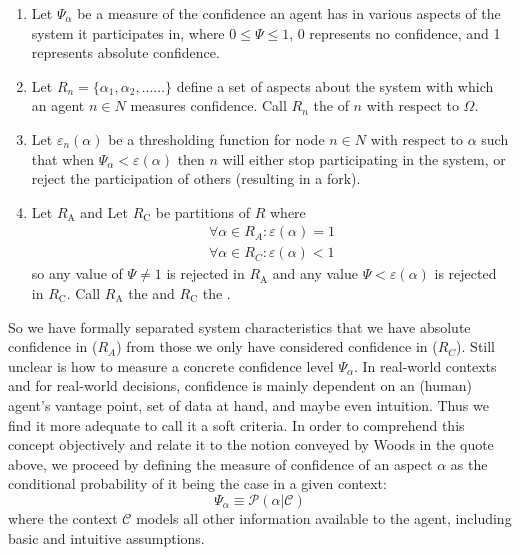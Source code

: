 \documentclass[twocolumn,showpacs,
  nofootinbib,aps,superscriptaddress,
  eqsecnum,prd,notitlepage,showkeys,10pt]{revtex4-1}
\begin{document}
\begin{enumerate}
\item Let $\Psi_\alpha$ be a measure of the confidence an agent has in various aspects of the system it participates in, where $0 \leq \Psi \leq 1$, 0 represents no confidence, and 1 represents absolute confidence.
\item Let $R_n = \{\alpha_1,\alpha_2,...\dots\}$ define a set of aspects about the system with which an agent $n \in N$ measures confidence.  Call $R_n$ the  of $n$ with respect to $\Omega$.
\item Let $\varepsilon_n(\alpha)$ be a thresholding function for node $n \in N$ with respect to $\alpha$ such that when $\Psi_\alpha < \varepsilon(\alpha)$ then $n$ will either stop participating in the system, or reject the participation of others (resulting in a fork).

\item  Let $R_\mathrm{A}$ and Let $R_\mathrm{C}$ be partitions of $R$ where
\begin{equation}
\begin{split}
\forall \alpha \in R_A:\varepsilon(\alpha)=1\\
\forall \alpha \in R_C:\varepsilon(\alpha)<1
\end{split}
\end{equation}
so any value of $\Psi \neq 1$ is rejected in $R_\mathrm{A}$ and any value $\Psi < \varepsilon(\alpha)$ is rejected in $R_\mathrm{C}$. Call $R_\mathrm{A}$ the  and $R_\mathrm{C}$ the .
\end{enumerate}

So we have formally separated system characteristics that we have absolute confidence in ($R_A$) from those we only have considered confidence in ($R_C$). Still unclear is how to measure a concrete confidence level $\Psi_\alpha$. In real-world contexts and for real-world decisions, confidence is mainly dependent on an (human) agent's vantage point, set of data at hand, and maybe even intuition. Thus we find it more adequate to call it a soft criteria. In order to comprehend this concept objectively and relate it to the notion conveyed by Woods in the quote above, we proceed by defining the measure of confidence of an aspect $\alpha$ as the conditional probability of it being the case in a given context:
\begin{equation}
\Psi_\alpha \equiv \mathcal{P}(\alpha | \mathcal{C})
\end{equation}
where the context $\mathcal{C}$ models all other information available to the agent, including basic and intuitive assumptions.
\end{document}
